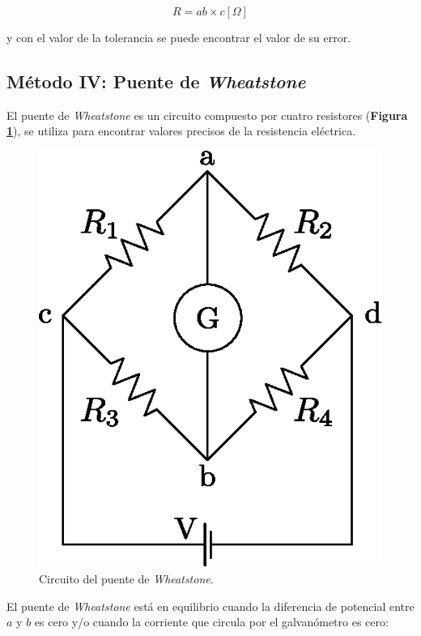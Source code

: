 \documentclass[letter,11pt]{article}
\begin{document}
\begin{equation}
    R = ab \times c [\Omega]
\label{color}
\end{equation}

y con el valor de la tolerancia se puede encontrar el valor de su error.

\subsection{Método IV: Puente de \emph{Wheatstone}}
El puente de \emph{Wheatstone} es un circuito compuesto por cuatro resistores
(\textbf{Figura \ref{figura2}}), se utiliza para encontrar valores precisos de
la resistencia eléctrica.

\begin{figure}[!h]
\centering
\includegraphics[scale=0.75]{resources/figura2.eps}
\caption{Circuito del puente de \emph{Wheatstone}.}
\label{figura2}
\end{figure}

El puente de \emph{Wheatstone} está en equilibrio cuando la diferencia de
potencial entre $a$ y $b$ es cero y/o cuando la corriente que circula por el
galvanómetro es cero:
\end{document}
